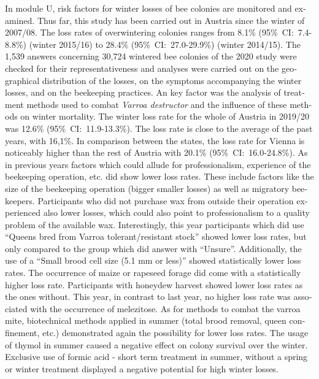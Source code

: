 \begin{otherlanguage}{english}
In module U, risk factors for winter losses of bee colonies are monitored and examined. Thus far, this study has been carried out in Austria since the winter of 2007/08. The loss rates of overwintering colonies ranges from 8.1\% (95\%~CI:~7.4-8.8\%) (winter 2015/16) to 28.4\% (95\%~CI:~27.0-29.9\%) (winter 2014/15). 
\newline
The 1,539 answers concerning 30,724 wintered bee colonies of the 2020 study were checked for their representativeness and analyses were carried out on the geographical distribution of the losses, on the symptoms accompanying the winter losses, and on the beekeeping practices. An key factor was the analysis of treatment methods used to combat \textit{Varroa destructor} and the influence of these methods on winter mortality. 
\newline
The winter loss rate for the whole of Austria in 2019/20 was 12.6\% (95\%~CI:~11.9-13.3\%). The loss rate is close to the average of the past years, with 16,1\%. In comparison between the states, the loss rate for Vienna is noticeably higher than the rest of Austria with 20.1\% (95\%~CI:~16.0-24.8\%).
\newline
As in previous years factors which could allude for professionalism, experience of the beekeeping operation, etc. did show lower loss rates. These include factors like the size of the beekeeping operation (bigger smaller losses) as well as migratory beekeepers. Participants who did not purchase wax from outside their operation experienced also lower losses, which could also point to professionalism to a quality problem of the available wax.
\newline
Interestingly, this year participants which did use \enquote{Queens bred from Varroa tolerant/resistant stock} showed lower loss rates, but only compared to the group which did answer with \enquote{Unsure}. Additionally, the use of a \enquote{Small brood cell size (5.1 mm or less)} showed statistically lower loss rates.
\newline
The occurrence of maize or rapeseed forage did come with a statistically higher loss rate. Participants with honeydew harvest showed lower loss rates as the ones without. This year, in contrast to last year, no higher loss rate was associated with the occurrence of melezitose.
\newline
As for methods to combat the varroa mite, biotechnical methods applied in summer (total brood removal, queen confinement, etc.) demonstrated again the possibility for lower loss rates. The usage of thymol in summer caused a negative effect on colony survival over the winter. Exclusive use of formic acid - short term treatment in summer, without a spring or winter treatment displayed a negative potential for high winter losses.

\end{otherlanguage}
